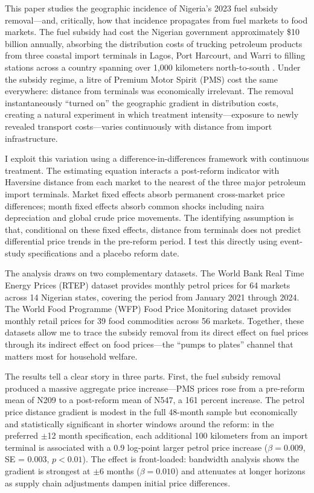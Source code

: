 \documentclass[12pt]{article}
\newcommand{\naira}{\textnigerian}
\renewcommand{\naira}{\mbox{\rlap{\hspace{0.09em}=}N}}
\begin{document}
This paper studies the geographic incidence of Nigeria's 2023 fuel subsidy removal---and, critically, how that incidence propagates from fuel markets to food markets. The fuel subsidy had cost the Nigerian government approximately \$10 billion annually, absorbing the distribution costs of trucking petroleum products from three coastal import terminals in Lagos, Port Harcourt, and Warri to filling stations across a country spanning over 1,000 kilometers north-to-south \citep{IMF2019,Bazilian2014}. Under the subsidy regime, a litre of Premium Motor Spirit (PMS) cost the same everywhere: distance from terminals was economically irrelevant. The removal instantaneously ``turned on'' the geographic gradient in distribution costs, creating a natural experiment in which treatment intensity---exposure to newly revealed transport costs---varies continuously with distance from import infrastructure.

I exploit this variation using a difference-in-differences framework with continuous treatment. The estimating equation interacts a post-reform indicator with Haversine distance from each market to the nearest of the three major petroleum import terminals. Market fixed effects absorb permanent cross-market price differences; month fixed effects absorb common shocks including naira depreciation and global crude price movements. The identifying assumption is that, conditional on these fixed effects, distance from terminals does not predict differential price trends in the pre-reform period. I test this directly using event-study specifications and a placebo reform date.

The analysis draws on two complementary datasets. The World Bank Real Time Energy Prices (RTEP) dataset provides monthly petrol prices for 64 markets across 14 Nigerian states, covering the period from January 2021 through 2024. The World Food Programme (WFP) Food Price Monitoring dataset provides monthly retail prices for 39 food commodities across 56 markets. Together, these datasets allow me to trace the subsidy removal from its direct effect on fuel prices through its indirect effect on food prices---the ``pumps to plates'' channel that matters most for household welfare.

The results tell a clear story in three parts. First, the fuel subsidy removal produced a massive aggregate price increase---PMS prices rose from a pre-reform mean of \naira{}209 to a post-reform mean of \naira{}547, a 161 percent increase. The petrol price distance gradient is modest in the full 48-month sample but economically and statistically significant in shorter windows around the reform: in the preferred $\pm$12 month specification, each additional 100 kilometers from an import terminal is associated with a 0.9 log-point larger petrol price increase ($\beta = 0.009$, SE = 0.003, $p < 0.01$). The effect is front-loaded: bandwidth analysis shows the gradient is strongest at $\pm$6 months ($\beta = 0.010$) and attenuates at longer horizons as supply chain adjustments dampen initial price differences.
\end{document}
